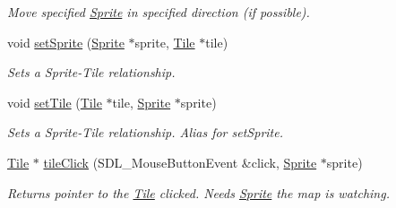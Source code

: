 \begin{DoxyCompactItemize}
\begin{DoxyCompactList}\small\item\em Move specified \hyperlink{class_sprite}{Sprite} in specified direction (if possible). \end{DoxyCompactList}\item 
void \hyperlink{class_terr_af750c3de5bc44381a3597b2a24895118}{set\+Sprite} (\hyperlink{class_sprite}{Sprite} $\ast$sprite, \hyperlink{class_tile}{Tile} $\ast$tile)\hypertarget{class_terr_af750c3de5bc44381a3597b2a24895118}{}\label{class_terr_af750c3de5bc44381a3597b2a24895118}

\begin{DoxyCompactList}\small\item\em Sets a Sprite-\/\+Tile relationship. \end{DoxyCompactList}\item 
void \hyperlink{class_terr_ad1bfd1e758bb709e1ab096d3a1853497}{set\+Tile} (\hyperlink{class_tile}{Tile} $\ast$tile, \hyperlink{class_sprite}{Sprite} $\ast$sprite)\hypertarget{class_terr_ad1bfd1e758bb709e1ab096d3a1853497}{}\label{class_terr_ad1bfd1e758bb709e1ab096d3a1853497}

\begin{DoxyCompactList}\small\item\em Sets a Sprite-\/\+Tile relationship. Alias for set\+Sprite. \end{DoxyCompactList}\item 
\hyperlink{class_tile}{Tile} $\ast$ \hyperlink{class_terr_aa89310ff118d264049bc5bc2da98f2b3}{tile\+Click} (S\+D\+L\+\_\+\+Mouse\+Button\+Event \&click, \hyperlink{class_sprite}{Sprite} $\ast$sprite)\hypertarget{class_terr_aa89310ff118d264049bc5bc2da98f2b3}{}\label{class_terr_aa89310ff118d264049bc5bc2da98f2b3}

\begin{DoxyCompactList}\small\item\em Returns pointer to the \hyperlink{class_tile}{Tile} clicked. Needs \hyperlink{class_sprite}{Sprite} the map is watching. \end{DoxyCompactList}\end{DoxyCompactItemize}
